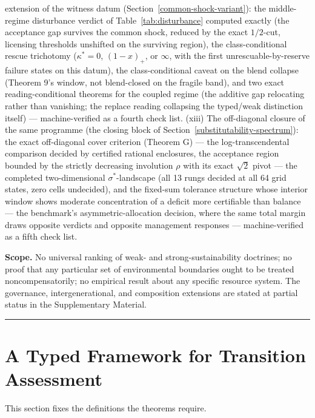 \documentclass[3p,11pt]{elsarticle}
\begin{document}
extension of the witness datum
(Section~\ref{common-shock-variant}): the middle-regime disturbance
verdict of Table~\ref{tab:disturbance} computed exactly (the
acceptance gap survives the common shock,
reduced by the exact \(1/2\)-cut, licensing thresholds unshifted
on the surviving region), the class-conditional rescue trichotomy
(\(\kappa^* = 0\),
\((1 - x)_+\), or \(\infty\), with the first
unrescuable-by-reserve failure states on this datum), the
class-conditional caveat on the blend collapse (Theorem 9's window,
not blend-closed on the fragile band), and two exact
reading-conditional theorems for the coupled regime (the additive
gap relocating rather than vanishing; the replace reading
collapsing the typed/weak distinction itself) --- machine-verified
as a fourth check list. (xiii) The off-diagonal closure of the same programme (the
closing block of Section~\ref{substitutability-spectrum}): the exact
off-diagonal cover criterion (Theorem G) --- the log-transcendental
comparison decided by certified rational enclosures, the acceptance
region bounded by the strictly decreasing involution \(\rho\) with
its exact \(\sqrt{2}\) pivot --- the completed two-dimensional
\(\sigma^*\)-landscape (all 13 rungs decided at all 64 grid states,
zero cells undecided), and the fixed-sum tolerance structure whose
interior window shows moderate concentration of a deficit
more certifiable than balance --- the benchmark's
asymmetric-allocation decision, where the same total margin draws
opposite verdicts and opposite management responses ---
machine-verified as a fifth check list.

\textbf{Scope.} No universal ranking of weak- and strong-sustainability doctrines; no proof that any particular set of environmental boundaries ought to be treated noncompensatorily; no empirical result about any specific resource system. The governance, intergenerational, and composition extensions are stated at partial status in the Supplementary Material.

\begin{center}\rule{0.5\linewidth}{0.5pt}\end{center}

\section{A Typed Framework for Transition
Assessment}\label{a-typed-framework-for-transition-assessment}

This section fixes the definitions the theorems require.
\end{document}
